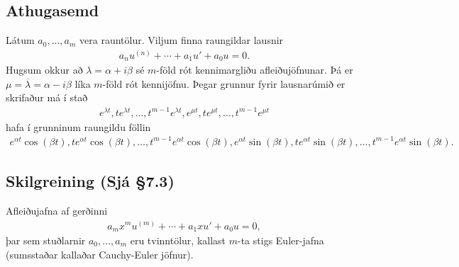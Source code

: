 \documentclass[a4paper,10pt,icelandic]{sphinxmanual}
\begin{document}
\subsection{Athugasemd}
\label{\detokenize{Kafli07:id3}}
Látum \(a_0, \ldots, a_m\) vera rauntölur. Viljum
finna raungildar lausnir
\begin{equation*}
\begin{split}a_nu^{(n)}+\cdots+a_1u'+a_0u=0.\end{split}
\end{equation*}
Hugsum okkur að \(\lambda=\alpha+i\beta\) sé \(m\)-föld rót kennimargliðu afleiðujöfnunar. Þá er \(\mu=\overline{\lambda}=\alpha-i\beta\) líka \(m\)-föld rót kennijöfnu. Þegar grunnur fyrir lausnarúmið er skrifaður má í stað
\begin{equation*}
\begin{split}e^{\lambda t}, te^{\lambda t},\dots, t^{m-1}e^{\lambda t},
e^{\mu t}, te^{\mu t},\dots, t^{m-1}e^{\mu t}\end{split}
\end{equation*}
hafa í grunninum raungildu föllin
\begin{equation*}
\begin{split}e^{\alpha t}\cos(\beta t), te^{\alpha t}\cos(\beta t), \ldots,
t^{m-1}e^{\alpha t}\cos(\beta t), e^{\alpha t}\sin(\beta t),
te^{\alpha t}\sin(\beta t), \ldots, t^{m-1}e^{\alpha t}\sin(\beta t).\end{split}
\end{equation*}

\subsection{Skilgreining (Sjá \S{}7.3)}
\label{\detokenize{Kafli07:skilgreining-sja-7-3}}
Afleiðujafna af gerðinni
\begin{equation*}
\begin{split}a_mx^mu^{(m)}+\cdots+a_1xu'+a_0u=0,\end{split}
\end{equation*}
þar sem stuðlarnir \(a_0,\ldots, a_m\) eru tvinntölur, kallast \(m\)-ta stigs Euler-jafna (sumsstaðar kallaðar Cauchy-Euler jöfnur).
\end{document}
